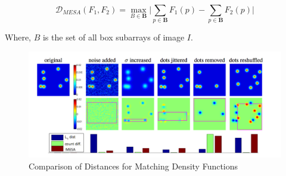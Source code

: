 \begin{displaymath}
    \mathcal{D}_{MESA}(F_{1}, F_{2}) = \max_{B \in \textbf{B}} \bigg\lvert \sum_{p \in \textbf{B}}F_{1}(p) - \sum_{p \in \textbf{B}}F_{2}(p) \bigg\rvert
\end{displaymath}

Where, $B$ is the set of all box subarrays of image $I$.

\begin{center}
    \begin{figure}
        \includegraphics[width=\textwidth]{Chapters/Fig/mesa}
        \caption{Comparison of Distances for Matching Density Functions}
        \label{fig:mesa}
    \end{figure}
\end{center}

